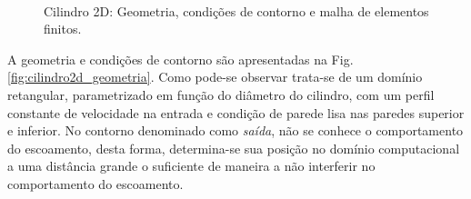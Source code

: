 \documentclass[tese_patricia]{subfiles}%
\begin{document}
\begin{figure}[!htb]
	\centering
	\\
	\caption{Cilindro 2D: Geometria, condições de contorno e malha de elementos finitos.}
\end{figure}


A geometria e condições de contorno são apresentadas na Fig. \ref{fig:cilindro2d_geometria}. Como pode-se observar trata-se de um domínio retangular, parametrizado em função do diâmetro do cilindro, com um perfil constante de velocidade na entrada e condição de parede lisa nas paredes superior e inferior. No contorno denominado como \textit{saída}, não se conhece o comportamento do escoamento, desta forma, determina-se sua posição no domínio computacional a uma distância grande o suficiente de maneira a não interferir no comportamento do escoamento. 
\end{document}
